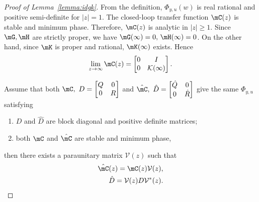 \appendix
\begin{proof}[Proof of Lemma~\ref{lemma:idgk}]
  From the definition, $\Phi_{y,u}(w)$ is real rational and positive semi-definite for $|z|=1$. The closed-loop transfer function $\mC(z)$ is stable and minimum phase. Therefore, $\mC(z)$ is analytic in $|z|\ge 1$. Since $\mG, \mH$ are strictly proper, we have $\mG(\infty) = 0,\,\mH(\infty)=0$. On the other hand, since $\mK$ is proper and rational, $\mK(\infty)$ exists. Hence
  \begin{align*}
    \lim_{z\rightarrow\infty} \mC(z)= \begin{bmatrix} 
      0 & I \\
      0 & \mathcal K(\infty)
    \end{bmatrix}.
  \end{align*}

  Assume that both $\mC,~D=\begin{bmatrix}
    Q & 0 \\ 
    0 & R
  \end{bmatrix}$ and $\hat \mC,~\hat D=\begin{bmatrix}
    \hat Q & 0 \\
    0 & \hat R
  \end{bmatrix}$ give the same $\Phi_{y,u}$ satisfying 
  \begin{enumerate}
  \item $D$ and $\hat D$ are block diagonal and positive definite matrices; \item both $\mC$ and $\hat \mC$ are stable and minimum phase,
  \end{enumerate}
  then there exists a paraunitary matrix $\mathcal V(z)$ such that \cite{Anderson_1982}
  \begin{align}
    \hat \mC(z)=\mC(z)\mathcal V(z),\label{eq:c1c2}\\
    \hat D= \mathcal V(z) D\mathcal V^*(z).\label{eq:q1q2}
  \end{align}


\end{proof}
